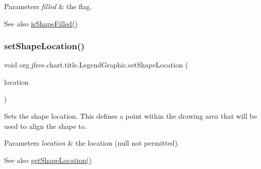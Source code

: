 \begin{DoxyParams}{Parameters}
{\em filled} & the flag.\\
\hline
\end{DoxyParams}
\begin{DoxySeeAlso}{See also}
\mbox{\hyperlink{classorg_1_1jfree_1_1chart_1_1title_1_1_legend_graphic_a7412e8640137319e0b3e1ec86d51170a}{is\+Shape\+Filled()}} 
\end{DoxySeeAlso}
\mbox{\label{classorg_1_1jfree_1_1chart_1_1title_1_1_legend_graphic_a24126e36b9ff60d4b4616943894b5d4b}} 
\subsubsection{\texorpdfstring{set\+Shape\+Location()}{setShapeLocation()}}
{\footnotesize\ttfamily void org.\+jfree.\+chart.\+title.\+Legend\+Graphic.\+set\+Shape\+Location (\begin{DoxyParamCaption}\item[{Rectangle\+Anchor}]{location }\end{DoxyParamCaption})}

Sets the shape location. This defines a point within the drawing area that will be used to align the shape to.


\begin{DoxyParams}{Parameters}
{\em location} & the location ({\ttfamily null} not permitted).\\
\hline
\end{DoxyParams}
\begin{DoxySeeAlso}{See also}
\mbox{\hyperlink{classorg_1_1jfree_1_1chart_1_1title_1_1_legend_graphic_a270c25c2d4228d350f95aa6653f49bf8}{get\+Shape\+Location()}} 
\end{DoxySeeAlso}
\mbox{\label{classorg_1_1jfree_1_1chart_1_1title_1_1_legend_graphic_a779afaf78a0072d77a1655ee25123dd3}} 
